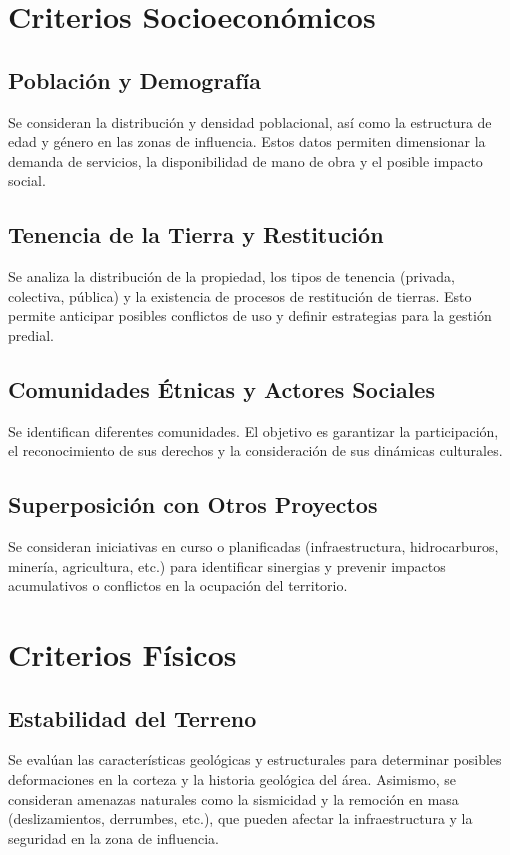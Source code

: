 \section{Criterios Socioeconómicos}

\subsection{Población y Demografía}
Se consideran la distribución y densidad poblacional, así como la estructura de edad y género en las zonas de influencia. Estos datos permiten dimensionar la demanda de servicios, la disponibilidad de mano de obra y el posible impacto social.

\subsection{Tenencia de la Tierra y Restitución}
Se analiza la distribución de la propiedad, los tipos de tenencia (privada, colectiva, pública) y la existencia de procesos de restitución de tierras. Esto permite anticipar posibles conflictos de uso y definir estrategias para la gestión predial.

\subsection{Comunidades Étnicas y Actores Sociales}
Se identifican diferentes comunidades. El objetivo es garantizar la participación, el reconocimiento de sus derechos y la consideración de sus dinámicas culturales.

\subsection{Superposición con Otros Proyectos}
Se consideran iniciativas en curso o planificadas (infraestructura, hidrocarburos, minería, agricultura, etc.) para identificar sinergias y prevenir impactos acumulativos o conflictos en la ocupación del territorio.

\section{Criterios Físicos}

\subsection{Estabilidad del Terreno}
Se evalúan las características geológicas y estructurales para determinar posibles deformaciones en la corteza y la historia geológica del área. Asimismo, se consideran amenazas naturales como la sismicidad y la remoción en masa (deslizamientos, derrumbes, etc.), que pueden afectar la infraestructura y la seguridad en la zona de influencia.

